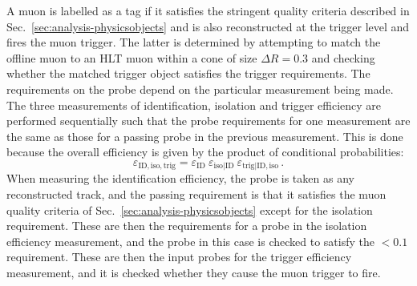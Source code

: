 A muon is labelled as a tag if it satisfies the stringent quality criteria 
described in Sec.~\ref{sec:analysis-physicsobjects} and is also reconstructed 
at the trigger level and fires the muon trigger. The latter is determined by 
attempting to match the 
offline muon to an HLT muon within a cone of size $\Delta R=0.3$ and checking 
whether the matched trigger object satisfies the trigger requirements.
The requirements on the probe depend on the particular measurement being made. 
The three measurements of identification, isolation and trigger efficiency are 
performed sequentially such that the probe requirements for one 
measurement are the same as those for a passing probe in the previous 
measurement. This is done because the overall efficiency is given by the 
product of conditional probabilities:
\begin{equation}
\varepsilon_{\mathrm{ID,iso,trig}} = \varepsilon_{\mathrm{ID}} ~ 
\varepsilon_{\mathrm{iso|ID}} ~ \varepsilon_{\mathrm{trig|ID,iso}} \, .
\label{eqn:muoneff}
\end{equation}
When measuring the identification efficiency, the probe is taken 
as any reconstructed track, and the passing requirement is that it satisfies 
the muon quality criteria of Sec.~\ref{sec:analysis-physicsobjects} except for 
the 
isolation requirement. These are then the requirements for a probe in the 
isolation efficiency measurement, and the probe in this case is checked to 
satisfy the {\reliso$<0.1$} requirement. These are then the input probes for 
the trigger efficiency measurement, and it is checked whether they cause the 
muon trigger to fire.



